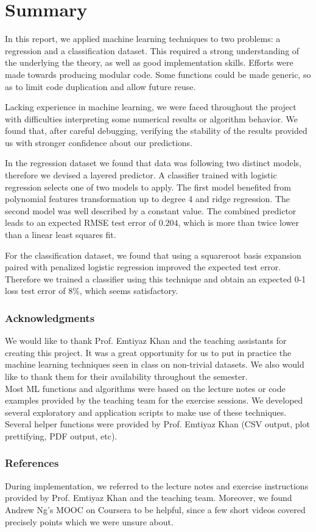 \documentclass{article} %
\begin{document}
\section{Summary}
  In this report, we applied machine learning techniques to two problems: a regression and a classification dataset. This required a strong understanding of the underlying the theory, as well as good implementation skills. Efforts were made towards producing modular code. Some functions could be made generic, so as to limit code duplication and allow future reuse.

  Lacking experience in machine learning, we were faced throughout the project with difficulties interpreting some numerical results or algorithm behavior. We found that, after careful debugging, verifying the stability of the results provided us with stronger confidence about our predictions.

  In the regression dataset we found that data was following two distinct models, therefore we devised a layered predictor. A classifier trained with logistic regression selects one of two models to apply. The first model benefited from polynomial features transformation up to degree 4 and ridge regression. The second model was well described by a constant value. The combined predictor leads to an expected RMSE test error of $0.204$, which is more than twice lower than a linear least squares fit.

  For the classification dataset, we found that using a squareroot basis expansion paired with penalized logistic regression improved the expected test error. Therefore we trained a classifier using this technique and obtain an expected 0-1 loss test error of $8\%$, which seems satisfactory.

\subsubsection*{Acknowledgments}
  We would like to thank Prof. Emtiyaz Khan and the teaching assistants for creating this project. It was a great opportunity for us to put in practice the machine learning techniques seen in class on non-trivial datasets. We also would like to thank them for their availability throughout the semester.\\
  Most ML functions and algorithms were based on the lecture notes or code examples provided by the teaching team for the exercise sessions. We developed several exploratory and application scripts to make use of these techniques. Several helper functions were provided by Prof. Emtiyaz Khan (CSV output, plot prettifying, PDF output, etc).

\subsubsection*{References}
  During implementation, we referred to the lecture notes and exercise instructions provided by Prof. Emtiyaz Khan and the teaching team. Moreover, we found Andrew Ng's MOOC on Coursera to be helpful, since a few short videos covered precisely points which we were unsure about.
\end{document}
